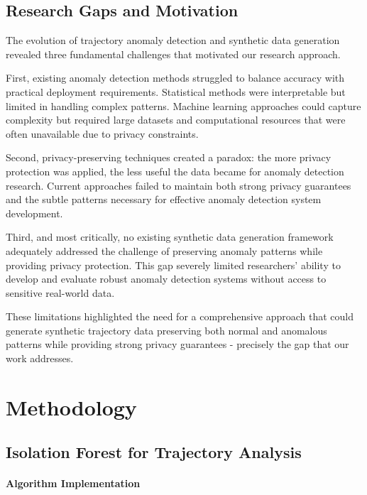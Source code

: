 \documentclass[runningheads]{llncs}
\begin{document}
\subsection{Research Gaps and Motivation}
\label{sec:gaps}

The evolution of trajectory anomaly detection and synthetic data generation revealed three fundamental challenges that motivated our research approach.

First, existing anomaly detection methods struggled to balance accuracy with practical deployment requirements. Statistical methods were interpretable but limited in handling complex patterns. Machine learning approaches could capture complexity but required large datasets and computational resources that were often unavailable due to privacy constraints.

Second, privacy-preserving techniques created a paradox: the more privacy protection was applied, the less useful the data became for anomaly detection research. Current approaches failed to maintain both strong privacy guarantees and the subtle patterns necessary for effective anomaly detection system development.

Third, and most critically, no existing synthetic data generation framework adequately addressed the challenge of preserving anomaly patterns while providing privacy protection. This gap severely limited researchers' ability to develop and evaluate robust anomaly detection systems without access to sensitive real-world data.

These limitations highlighted the need for a comprehensive approach that could generate synthetic trajectory data preserving both normal and anomalous patterns while providing strong privacy guarantees - precisely the gap that our work addresses.

\section{Methodology}
\label{sec:methodology}

\subsection{Isolation Forest for Trajectory Analysis}
\label{sec:iso}

\paragraph{Algorithm Implementation}
\end{document}
